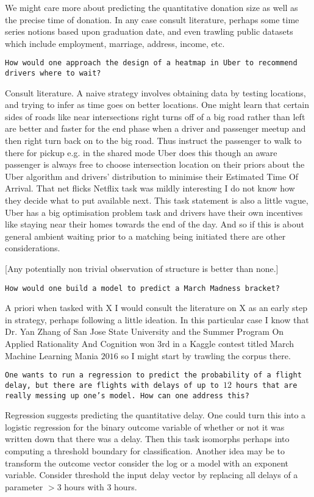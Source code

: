 We might care more about predicting the quantitative donation size as well as the precise time of donation. In any case consult literature, perhaps some time series notions based upon graduation date, and even trawling public datasets which include employment, marriage, address, income, etc.

\texttt{How would one approach the design of a heatmap in Uber to recommend drivers where to wait?}

Consult literature. A naive strategy involves obtaining data by testing locations, and trying to infer as time goes on better locations. One might learn that certain sides of roads like near intersections right turns off of a big road rather than left are better and faster for the end phase when a driver and passenger meetup and then right turn back on to the big road. Thus instruct the passenger to walk to there for pickup e.g. in the shared mode Uber does this though an aware passenger is always free to choose intersection location on their priors about the Uber algorithm and drivers' distribution to minimise their Estimated Time Of Arrival. That net flicks Netflix task was mildly interesting I do not know how they decide what to put available next. This task statement is also a little vague, Uber has a big optimisation problem task and drivers have their own incentives like staying near their homes towards the end of the day. And so if this is about general ambient waiting prior to a matching being initiated there are other considerations.

[Any potentially non trivial observation of structure is better than none.]

\texttt{How would one build a model to predict a March Madness bracket?}

A priori when tasked with X I would consult the literature on X as an early step in strategy, perhaps following a little ideation. In this particular case I know that Dr. Yan Zhang of San Jose State University and the Summer Program On Applied Rationality And Cognition won $3$rd in a Kaggle contest titled March Machine Learning Mania $2016$ so I might start by trawling the corpus there.

\texttt{One wants to run a regression to predict the probability of a flight delay, but there are flights with delays of up to $12$ hours that are really messing up one's model. How can one address this?}

Regression suggests predicting the quantitative delay. One could turn this into a logistic regression for the binary outcome variable of whether or not it was written down that there was a delay. Then this task isomorphs perhaps into computing a threshold boundary for classification. Another idea may be to transform the outcome vector consider the log or a model with an exponent variable. Consider threshold the input delay vector by replacing all delays of a parameter $>3$ hours with $3$ hours.

